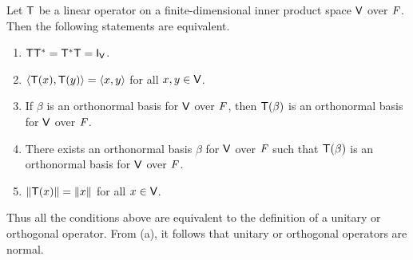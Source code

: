 \begin{thm}\label{6.18}
	Let \(\mathsf{T}\) be a linear operator on a finite-dimensional inner product space \(\mathsf{V}\) over \(\mathit{F}\).
	Then the following statements are equivalent.
	\begin{enumerate}
		\item \(\T \T^* = \T^* \T = \IT[\V]\).
		\item \(\left\langle\mathsf{T}(x), \mathsf{T}(y)\right\rangle = \left\langle x, y\right\rangle\) for all \(x, y \in \mathsf{V}\).
		\item If \(\beta\) is an orthonormal basis for \(\mathsf{V}\) over \(\mathit{F}\), then \(\mathsf{T}(\beta)\) is an orthonormal basis for \(\mathsf{V}\) over \(\mathit{F}\).
		\item There exists an orthonormal basis \(\beta\) for \(\mathsf{V}\) over \(\mathit{F}\) such that \(\mathsf{T}(\beta)\) is an orthonormal basis for \(\mathsf{V}\) over \(\mathit{F}\).
		\item \(\left\lVert\mathsf{T}(x)\right\rVert = \left\lVert x\right\rVert\) for all \(x \in \mathsf{V}\).
	\end{enumerate}
	Thus all the conditions above are equivalent to the definition of a unitary or orthogonal operator.
	From (a), it follows that unitary or orthogonal operators are normal.
\end{thm}

